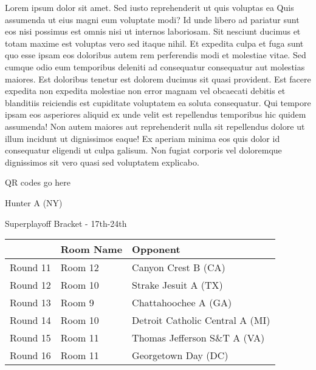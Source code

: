\documentclass{article}%
\begin{document}
\vspace*{8pt}%
\linebreak%
\newline%
\newline%
    Lorem ipsum dolor sit amet. Sed iusto reprehenderit ut quis voluptas ea Quis assumenda ut eius magni eum voluptate modi? Id unde libero ad pariatur sunt eos nisi possimus est omnis nisi ut internos laboriosam. Sit nesciunt ducimus et totam maxime est voluptas vero sed itaque nihil. Et expedita culpa et fuga sunt quo esse ipsam eos doloribus autem rem perferendis modi et molestiae vitae.\newline%
\newline%
    Sed cumque odio eum temporibus deleniti ad consequatur consequatur aut molestias maiores. Est doloribus tenetur est dolorem ducimus sit quasi provident. Est facere expedita non expedita molestiae non error magnam vel obcaecati debitis et blanditiis reiciendis est cupiditate voluptatem ea soluta consequatur. Qui tempore ipsam eos asperiores aliquid ex unde velit est repellendus temporibus hic quidem assumenda!\newline%
\newline%
    Non autem maiores aut reprehenderit nulla sit repellendus dolore ut illum incidunt ut dignissimos eaque! Ex aperiam minima eos quis dolor id consequatur eligendi ut culpa galisum. Non fugiat corporis vel doloremque dignissimos sit vero quasi sed voluptatem explicabo.\newline%
\newline%
\vspace*{30pt}%
\begin{center}%
\begin{Huge}%
QR codes go here%
\end{Huge}%
\end{center}%
\newpage%
\begin{center}%
\begin{Huge}%
Hunter A (NY)%
\end{Huge}%
\vspace*{8pt}%
\linebreak%
\begin{Large}%
Superplayoff Bracket {-} 17th{-}24th%
\end{Large}%
\end{center}%
%
\begin{tabularx}{\textwidth}{|c|Y|Y|}%
\hline%
&Room Name&Opponent\\%
\hline%
Round 11&Room 12&Canyon Crest B (CA)\\%
Round 12&Room 10&Strake Jesuit A (TX)\\%
Round 13&Room 9&Chattahoochee A (GA)\\%
Round 14&Room 10&Detroit Catholic Central A (MI)\\%
Round 15&Room 11&Thomas Jefferson S\&T A (VA)\\%
Round 16&Room 11&Georgetown Day (DC)\\%
\hline%
\end{tabularx}%
\end{document}
